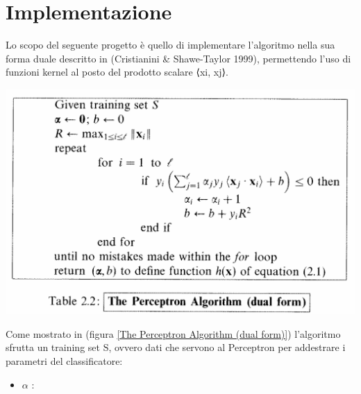 \documentclass{article}
\begin{document}
    \section{Implementazione} 
    Lo scopo del seguente progetto è quello di implementare l'algoritmo nella sua forma duale descritto in (Cristianini \& Shawe-Taylor 1999), permettendo l'uso di funzioni kernel al posto del prodotto
    scalare ⟨xi, xj⟩.
    \begin{center}
        \includegraphics[width=0.7\linewidth]{pseudocodice_perceptron.png}
        \label{The Perceptron Algorithm (dual form)}
    \end{center}
    Come mostrato in (figura \ref*{The Perceptron Algorithm (dual form)}) l'algoritmo sfrutta un training set S, ovvero dati che servono al Perceptron per addestrare i parametri del classificatore: 
    \begin{itemize}
        \item $\alpha$ : 
    \end{itemize}
\end{document}
